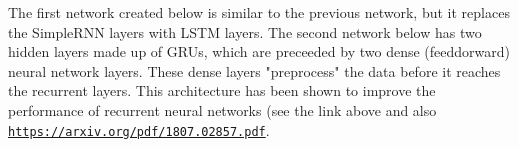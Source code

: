 \documentclass[%
oneside,                 %
final,                   %
10pt]{article}
\begin{document}
The first network created below is similar to the previous network,
but it replaces the SimpleRNN layers with LSTM layers.  The second
network below has two hidden layers made up of GRUs, which are
preceeded by two dense (feeddorward) neural network layers.  These
dense layers "preprocess" the data before it reaches the recurrent
layers.  This architecture has been shown to improve the performance
of recurrent neural networks (see the link above and also
\href{{https://arxiv.org/pdf/1807.02857.pdf}}{\nolinkurl{https://arxiv.org/pdf/1807.02857.pdf}}.
\end{document}
